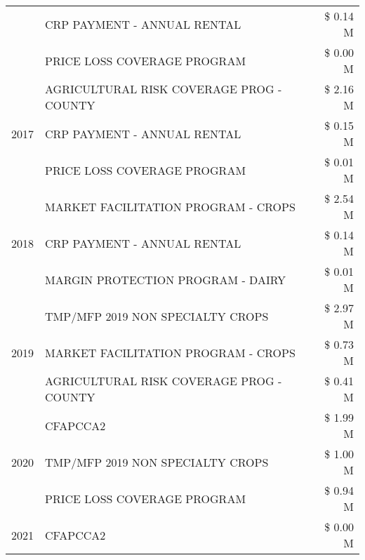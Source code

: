 \begin{tabular}{llr}
 & CRP PAYMENT - ANNUAL RENTAL & \$ 0.14 M \\
 & PRICE LOSS COVERAGE PROGRAM & \$ 0.00 M \\
\cline{1-3}
\multirow[t]{3}{*}{2017} & AGRICULTURAL RISK COVERAGE PROG - COUNTY & \$ 2.16 M \\
 & CRP PAYMENT - ANNUAL RENTAL & \$ 0.15 M \\
 & PRICE LOSS COVERAGE PROGRAM & \$ 0.01 M \\
\cline{1-3}
\multirow[t]{3}{*}{2018} & MARKET FACILITATION PROGRAM - CROPS & \$ 2.54 M \\
 & CRP PAYMENT - ANNUAL RENTAL & \$ 0.14 M \\
 & MARGIN PROTECTION PROGRAM - DAIRY & \$ 0.01 M \\
\cline{1-3}
\multirow[t]{3}{*}{2019} & TMP/MFP 2019 NON SPECIALTY CROPS & \$ 2.97 M \\
 & MARKET FACILITATION PROGRAM - CROPS & \$ 0.73 M \\
 & AGRICULTURAL RISK COVERAGE PROG - COUNTY & \$ 0.41 M \\
\cline{1-3}
\multirow[t]{3}{*}{2020} & CFAPCCA2 & \$ 1.99 M \\
 & TMP/MFP 2019 NON SPECIALTY CROPS & \$ 1.00 M \\
 & PRICE LOSS COVERAGE PROGRAM & \$ 0.94 M \\
\cline{1-3}
2021 & CFAPCCA2 & \$ 0.00 M \\
\cline{1-3}
\bottomrule
\end{tabular}
